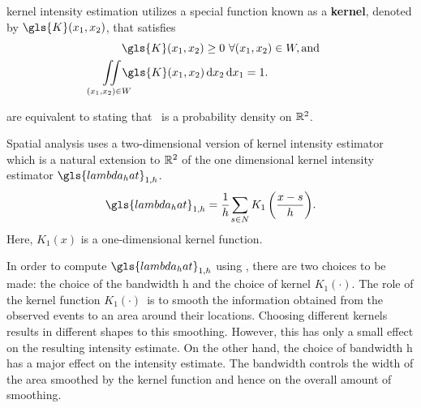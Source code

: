\gls{kernel intensity estimation} utilizes a special function known as a \textbf{\gls{kernel}},
denoted by $\gls{K}\xvec$,
that satisfies
\begin{align}
    & \hspace{1.75em} \gls{K}\xvec \ge 0~ \forall \xvec \in W, \text{and} \label{eq:k_pos} \\%
    & \iintW{\gls{K}\xvec} = 1 \text{.} \label{eq:k_1}%
\end{align}

 are equivalent to stating that \Kdots~is a probability density on $\mathbb{R}^2$.

Spatial analysis uses a two-dimensional version of \gls{kernel intensity estimator}
which is a natural extension to $\mathbb{R}^2$ of the one dimensional \gls{kernel intensity estimator} $\gls{lambda_hat}_{1,h}$.
\begin{equation}
    \label{eq:lambda_hat_1}
    \gls{lambda_hat}_{1,h} = \sumSone{K_1\left( \frac{x - s}{h} \right)} \text{.}%
\end{equation}
Here, $K_1(x)$ is a one-dimensional kernel function.

In order to compute $\gls{lambda_hat}_{1,h}$ using ,
there are two choices to be made: the choice of the bandwidth \gls{h}
and the choice of \gls{kernel} $K_1(\cdot)$.
The role of the \gls{kernel} function $K_1(\cdot)$~is to smooth the information obtained
from the observed \glspl{event} to an area around their locations.
Choosing different \glspl{kernel} results in different shapes to this smoothing.
However, this has only a small effect on the resulting \gls{intensity} estimate.
On the other hand,
the choice of bandwidth \gls{h} has a major effect on the \gls{intensity} estimate.
The bandwidth controls the width of the area smoothed by the \gls{kernel} function and hence on the overall amount of smoothing.

